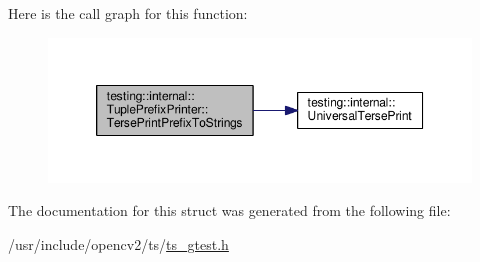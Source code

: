 Here is the call graph for this function\-:\nopagebreak
\begin{figure}[H]
\begin{center}
\leavevmode
\includegraphics[width=350pt]{structtesting_1_1internal_1_1TuplePrefixPrinter_afc57456f5cc2a08c11da53094c49dae1_cgraph}
\end{center}
\end{figure}




The documentation for this struct was generated from the following file\-:\begin{DoxyCompactItemize}
\item 
/usr/include/opencv2/ts/\hyperlink{ts__gtest_8h}{ts\-\_\-gtest.\-h}\end{DoxyCompactItemize}
